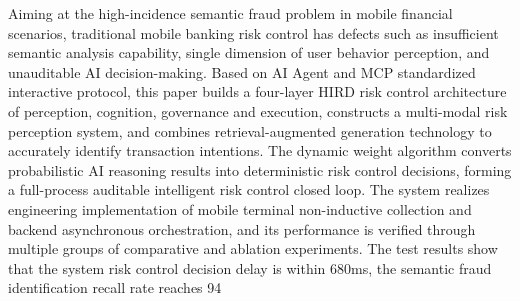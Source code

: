 Aiming at the high-incidence semantic fraud problem in mobile financial scenarios, traditional mobile banking risk control has defects such as insufficient semantic analysis capability, single dimension of user behavior perception, and unauditable AI decision-making. Based on AI Agent and MCP standardized interactive protocol, this paper builds a four-layer HIRD risk control architecture of perception, cognition, governance and execution, constructs a multi-modal risk perception system, and combines retrieval-augmented generation technology to accurately identify transaction intentions. The dynamic weight algorithm converts probabilistic AI reasoning results into deterministic risk control decisions, forming a full-process auditable intelligent risk control closed loop. The system realizes engineering implementation of mobile terminal non-inductive collection and backend asynchronous orchestration, and its performance is verified through multiple groups of comparative and ablation experiments. The test results show that the system risk control decision delay is within 680ms, the semantic fraud identification recall rate reaches 94%